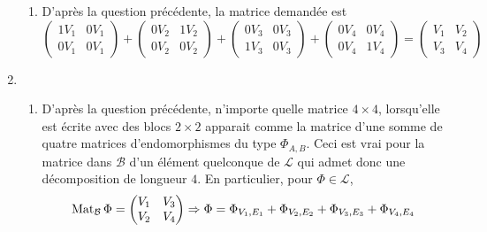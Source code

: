 \begin{enumerate}
\begin{enumerate}
 \item D'après la question précédente, la matrice demandée est
\begin{displaymath}
\begin{pmatrix}
1V_{1} & 0V_{1} \\ 
0V_{1} & 0V_{1}
\end{pmatrix}
+ 
\begin{pmatrix}
0V_{2} & 1V_{2} \\ 
0V_{2} & 0V_{2}
\end{pmatrix}
+ 
\begin{pmatrix}
0V_{3} & 0V_{3} \\ 
1V_{3} & 0V_{3}
\end{pmatrix}
+ 
\begin{pmatrix}
0V_{4} & 0V_{4} \\ 
0V_{4} & 1V_{4}
\end{pmatrix}
=
\begin{pmatrix}
V_{1} & V_{2} \\ 
V_{3} & V_{4}
\end{pmatrix}
\end{displaymath}
\end{enumerate}

\item
\begin{enumerate}
 \item D'après la question précédente, n'importe quelle matrice $4\times4$, lorsqu'elle est écrite avec des blocs $2\times2$ apparait comme la matrice d'une somme de quatre matrices d'endomorphismes du type $\Phi_{A,B}$. Ceci est vrai pour la matrice dans $\mathcal{B}$ d'un élément quelconque de $\mathcal{L}$ qui admet donc une décomposition de longueur $4$.\newline
En particulier, pour $\Phi\in \mathcal{L}$,
\begin{displaymath}
 \operatorname{Mat}_{\mathcal{B}}\Phi=
\begin{pmatrix}
V_{1} & V_{3} \\ 
V_{2} & V_{4}
\end{pmatrix}
\Rightarrow
\Phi = \Phi_{V_1,E_1}+\Phi_{V_2,E_2}+\Phi_{V_3,E_3}+\Phi_{V_4,E_4}
\end{displaymath}


\end{enumerate}
\end{enumerate}
